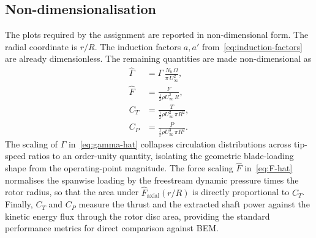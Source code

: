 \subsection{Non-dimensionalisation}
\label{sec:nondim}

The plots required by the assignment are reported in non-dimensional form. The radial coordinate is $r/R$. The induction factors $a,a'$ from~\eqref{eq:induction-factors} are already dimensionless. The remaining quantities are made non-dimensional as
\begin{align}
\hat{\Gamma} &= \Gamma\,\frac{N_b\,\Omega}{\pi\,U_\infty^{2}}, \label{eq:gamma-hat}\\
\hat{F}      &= \frac{F}{\tfrac{1}{2}\rho U_\infty^{2}\,R}, \label{eq:F-hat}\\
C_T          &= \frac{T}{\tfrac{1}{2}\rho U_\infty^{2}\,\pi R^{2}}, \label{eq:CT}\\
C_P          &= \frac{P}{\tfrac{1}{2}\rho U_\infty^{3}\,\pi R^{2}}. \label{eq:CP}
\end{align}
The scaling of $\hat{\Gamma}$ in~\eqref{eq:gamma-hat} collapses circulation distributions across tip-speed ratios to an order-unity quantity, isolating the geometric blade-loading shape from the operating-point magnitude. The force scaling $\hat{F}$ in~\eqref{eq:F-hat} normalises the spanwise loading by the freestream dynamic pressure times the rotor radius, so that the area under $\hat{F}_{\text{axial}}(r/R)$ is directly proportional to $C_T$. Finally, $C_T$ and $C_P$ measure the thrust and the extracted shaft power against the kinetic energy flux through the rotor disc area, providing the standard performance metrics for direct comparison against BEM.